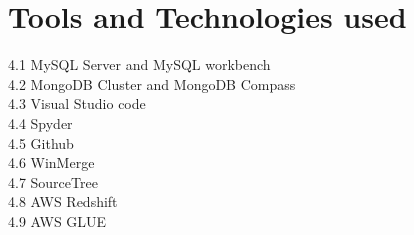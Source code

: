 \documentclass[11pt,journal,compsoc]{IEEEtran}
\begin{document}
\section{Tools and Technologies used}
4.1 MySQL Server and MySQL workbench \\
4.2 MongoDB Cluster and MongoDB Compass \\
4.3 Visual Studio code \\
4.4 Spyder \\
4.5 Github  \\
4.6 WinMerge \\
4.7 SourceTree \\
4.8 AWS Redshift \\
4.9 AWS GLUE \\
\end{document}
